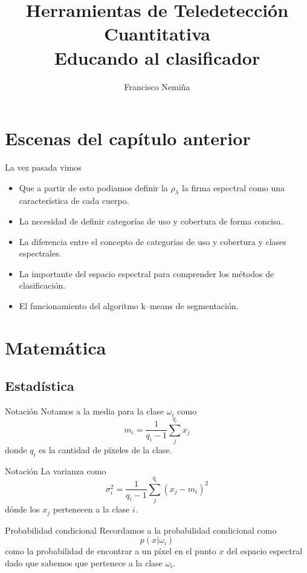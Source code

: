 \documentclass[]{beamer}
\title{Herramientas de Teledetección Cuantitativa\\{\small Educando al clasificador}}
\author{Francisco Nemiña}
\institute{Unidad de Educación y Formación Masiva \\
Comisión Nacional de Actividades Espaciales}
\begin{document}
\begin{frame}
    \maketitle
\end{frame}

\section{Escenas del capítulo anterior}
\begin{frame}{La vez pasada vimos}
  \begin{itemize}[<+->]
    \item Que a partir de esto podiamos definir la $\rho_\lambda$ la firma espectral como una característica de cada cuerpo.
    \item La necesidad de definir categorías de uso y cobertura de forma concisa.
    \item La diferencia entre el concepto de categorias de uso y cobertura y clases espectrales.
    \item La importante del espacio espectral para comprender los métodos de clasificación.
    \item El funcionamiento del algoritmo k--means de segmentación.
  \end{itemize}
\end{frame}
\section{Matemática}
\subsection{Estadística}
\begin{frame}{\subsecname}
  \begin{block}{Notación}
    Notamos a la media para la clase $\omega_i$ como $$m_i = \frac{1}{q_i-1} \sum_j^{q_i} x_j$$ donde $q_i$ es la cantidad de píxeles de la clase.
  \end{block}\pause
  \begin{block}{Notación}
    La varianza como $$\sigma_i^2 = \frac{1}{q_i-1} \sum_j^{q_i} (x_j-m_i)^2$$ dónde los $x_j$ pertenecen a la clase $i$.
  \end{block}
\end{frame}

\begin{frame}{\subsecname}
  \begin{block}{Probabilidad condicional}
    Recordamos a la probabilidad condicional como $$p(x|\omega_i)$$ como la probabilidad de encontrar a un píxel en el punto $x$ del espacio espectral dado que sabemos que pertenece a la clase $\omega_i$.
  \end{block}
\end{frame}
\end{document}
